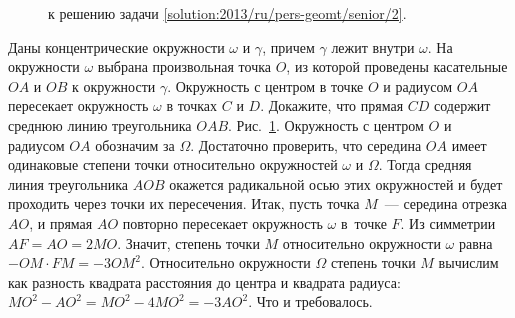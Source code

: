 \ifsolution
\begin{figure}\centering
    \caption{к решению задачи \ref{solution:2013/ru/pers-geomt/senior/2}.}
    \label{fig:solution:2013/ru/pers-geomt/senior/2}
\end{figure}
\fi %

\problem
Даны концентрические окружности $\omega$ и $\gamma$, причем $\gamma$ лежит
внутри $\omega$.
На окружности $\omega$ выбрана произвольная точка $O$, из которой проведены
касательные $OA$ и $OB$ к окружности $\gamma$.
Окружность с центром в точке $O$ и радиусом $OA$ пересекает окружность $\omega$
в точках $C$ и $D$.
Докажите, что прямая $CD$ содержит среднюю линию треугольника $OAB$.
\solution
\label{solution:2013/ru/pers-geomt/senior/2}
Рис.~\ref{fig:solution:2013/ru/pers-geomt/senior/2}.
Окружность с центром $O$ и радиусом $OA$ обозначим за $\Omega$.
Достаточно проверить, что середина $OA$ имеет одинаковые степени точки
относительно окружностей $\omega$ и $\Omega$.
Тогда средняя линия треугольника $AOB$ окажется радикальной осью этих
окружностей и будет проходить через точки их пересечения.
Итак, пусть точка $M$~--- середина отрезка $AO$, и прямая $AO$ повторно
пересекает окружность $\omega$ в~точке $F$.
Из симметрии $AF = AO = 2 MO$.
Значит, степень точки $M$ относительно окружности $\omega$ равна
$- OM \cdot FM = - 3 OM^2$.
Относительно окружности $\Omega$ степень точки $M$ вычислим как разность
квадрата расстояния до центра и квадрата радиуса:
$MO^2 - AO^2 = MO^2 - 4 MO^2 = - 3 AO^2$.
Что и требовалось.
\endproblem
